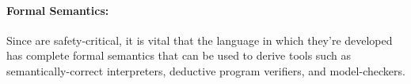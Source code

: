 \paragraph{Formal Semantics:}

Since \CIGs{} are safety-critical, it is vital that the
language in which they're developed has complete formal semantics that
can be used to derive tools such as semantically-correct interpreters,
deductive program verifiers, and model-checkers.


